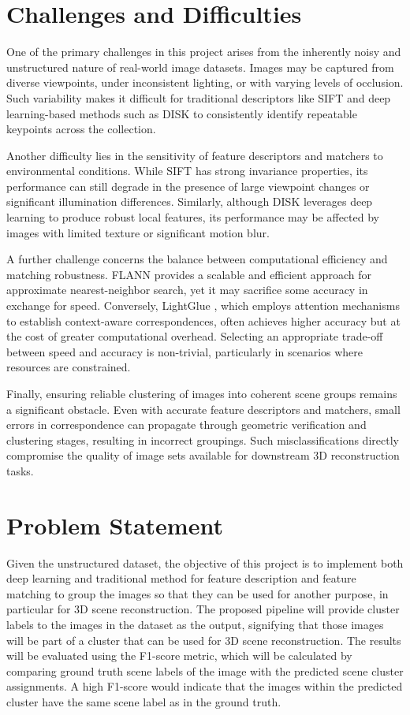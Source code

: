 \documentclass[report.tex]{subfiles}
\begin{document}
\section{Challenges and Difficulties}

One of the primary challenges in this project arises from the inherently noisy and unstructured nature of real-world image datasets. Images may be captured from diverse viewpoints, under inconsistent lighting, or with varying levels of occlusion. Such variability makes it difficult for traditional descriptors like SIFT\cite{lowe2004sift} and deep learning-based methods such as DISK\cite{tyszkiewicz2020disk} to consistently identify repeatable keypoints across the collection.

Another difficulty lies in the sensitivity of feature descriptors and matchers to environmental conditions. While SIFT has strong invariance properties, its performance can still degrade in the presence of large viewpoint changes or significant illumination differences. Similarly, although DISK leverages deep learning to produce robust local features, its performance may be affected by images with limited texture or significant motion blur.

A further challenge concerns the balance between computational efficiency and matching robustness. FLANN \cite{muja2009fast} provides a scalable and efficient approach for approximate nearest-neighbor search, yet it may sacrifice some accuracy in exchange for speed. Conversely, LightGlue \cite{lindenberger2023lightgluelocalfeaturematching}, which employs attention mechanisms to establish context-aware correspondences, often achieves higher accuracy but at the cost of greater computational overhead. Selecting an appropriate trade-off between speed and accuracy is non-trivial, particularly in scenarios where resources are constrained.

Finally, ensuring reliable clustering of images into coherent scene groups remains a significant obstacle. Even with accurate feature descriptors and matchers, small errors in correspondence can propagate through geometric verification and clustering stages, resulting in incorrect groupings. Such misclassifications directly compromise the quality of image sets available for downstream 3D reconstruction tasks.


    \section{Problem Statement}
 Given the unstructured dataset, the objective of this project is to implement both deep learning and traditional method for feature description and feature matching to group the images so that they can be used for another purpose, in particular for 3D scene reconstruction. The proposed pipeline will provide cluster labels to the images in the dataset as the output, signifying that those images will be part of a cluster that can be used for 3D scene reconstruction. The results will be evaluated using the F1-score metric, which will be calculated by comparing ground truth scene labels of the image with the predicted scene cluster assignments. A high F1-score would indicate that the images within the predicted cluster have the same scene label as in the ground truth.
\end{document}
